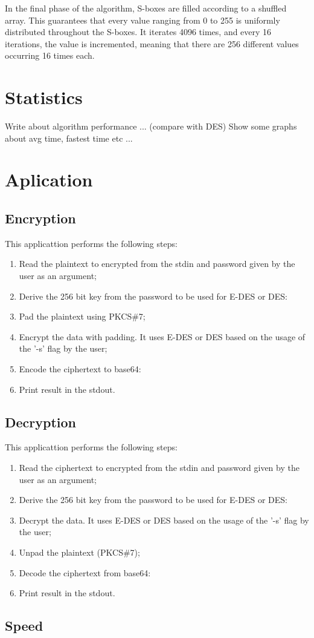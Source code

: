 \documentclass{article} %
\begin{document}
In the final phase of the algorithm, S-boxes are filled according to a shuffled array. This guarantees that every value ranging from 0 to 255 is uniformly distributed throughout the S-boxes. It iterates 4096 times, and every 16 iterations, the value is incremented, meaning that there are 256 different values occurring 16 times each.
\section{Statistics}
Write about algorithm performance ... (compare with DES)
Show some graphs about avg time, fastest time etc ...

\section {Aplication}
\subsection{Encryption}
This applicattion performs the following steps:
\begin{enumerate}
  \item Read the plaintext to encrypted from the stdin and password given by the user as an argument;
  \item Derive the 256 bit key from the password to be used for E-DES or DES:
  \item Pad the plaintext using PKCS\#7;
  \item Encrypt the data with padding. It uses E-DES or DES based on the usage of the '-s' flag by the user;
  \item Encode the ciphertext to base64:
  \item Print result in the stdout.
\end{enumerate}

\subsection{Decryption}
This applicattion performs the following steps:
\begin{enumerate}
  \item Read the ciphertext to encrypted from the stdin and password given by the user as an argument;
  \item Derive the 256 bit key from the password to be used for E-DES or DES:
  \item Decrypt the data. It uses E-DES or DES based on the usage of the '-s' flag by the user;
  \item Unpad the plaintext (PKCS\#7);
  \item Decode the ciphertext from base64:
  \item Print result in the stdout.
\end{enumerate}

\subsection{Speed}
\end{document}
